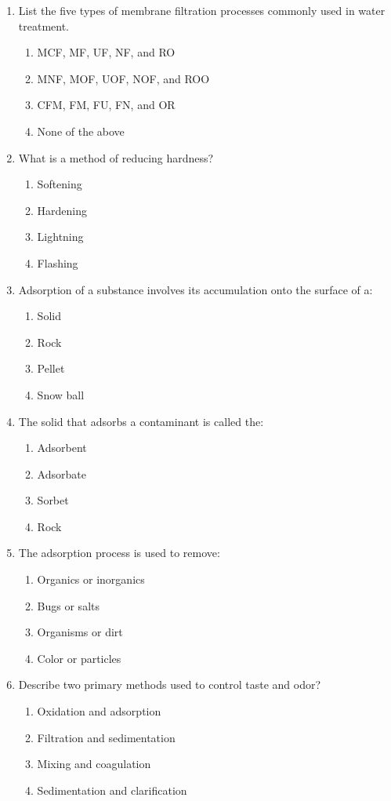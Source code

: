 \documentclass{article}
\begin{document}
\begin{enumerate}
\item List the five types of membrane filtration processes commonly used in water
treatment.
\begin{enumerate}
\item MCF, MF, UF, NF, and RO
\item MNF, MOF, UOF, NOF, and ROO
\item CFM, FM, FU, FN, and OR
\item None of the above
\end{enumerate}

\item What is a method of reducing hardness?
\begin{enumerate}
\item Softening
\item Hardening
\item Lightning
\item Flashing
\end{enumerate}

\item Adsorption of a substance involves its accumulation onto the surface of a:
\begin{enumerate}
\item Solid
\item Rock
\item Pellet
\item Snow ball
\end{enumerate}

\item The solid that adsorbs a contaminant is called the:
\begin{enumerate}
\item Adsorbent
\item Adsorbate
\item Sorbet
\item Rock
\end{enumerate}

\item The adsorption process is used to remove:
\begin{enumerate}
\item Organics or inorganics
\item Bugs or salts
\item Organisms or dirt
\item Color or particles
\end{enumerate}

\item Describe two primary methods used to control taste and odor?
\begin{enumerate}
\item Oxidation and adsorption
\item Filtration and sedimentation
\item Mixing and coagulation
\item Sedimentation and clarification
\end{enumerate}




\end{enumerate}
\end{document}
